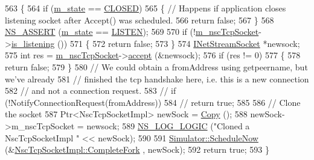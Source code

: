 \begin{DoxyCode}
563 \{
564   \textcolor{keywordflow}{if} (\hyperlink{classns3_1_1NscTcpSocketImpl_aa60a97fe06f4b74ed57101a297d6216c}{m\_state} == \hyperlink{group__tcp_gga3929cdb47bdf159657fa24054aa5ca03a9ce7d71243551037394c5e691627e66f}{CLOSED})
565     \{  \textcolor{comment}{// Happens if application closes listening socket after Accept() was scheduled.}
566       \textcolor{keywordflow}{return} \textcolor{keyword}{false};
567     \}
568   \hyperlink{assert_8h_a6dccdb0de9b252f60088ce281c49d052}{NS\_ASSERT} (\hyperlink{classns3_1_1NscTcpSocketImpl_aa60a97fe06f4b74ed57101a297d6216c}{m\_state} == \hyperlink{group__tcp_gga3929cdb47bdf159657fa24054aa5ca03a581d49096b20553996c0ef8aaf2712f8}{LISTEN});
569 
570   \textcolor{keywordflow}{if} (!\hyperlink{classns3_1_1NscTcpSocketImpl_a540a25a7e3ea5777872b16662da3e616}{m\_nscTcpSocket}->\hyperlink{structINetStreamSocket_a26fa9760ab071598a8b1b4da9e852b09}{is\_listening} ())
571     \{
572       \textcolor{keywordflow}{return} \textcolor{keyword}{false};
573     \}
574   \hyperlink{structINetStreamSocket}{INetStreamSocket} *newsock;
575   \textcolor{keywordtype}{int} res = \hyperlink{classns3_1_1NscTcpSocketImpl_a540a25a7e3ea5777872b16662da3e616}{m\_nscTcpSocket}->\hyperlink{structINetStreamSocket_af2bd0b33de3a8a30f539eda297786188}{accept} (&newsock);
576   \textcolor{keywordflow}{if} (res != 0)
577     \{
578       \textcolor{keywordflow}{return} \textcolor{keyword}{false};
579     \}
580 \textcolor{comment}{// We could obtain a fromAddress using getpeername, but we've already}
581 \textcolor{comment}{// finished the tcp handshake here, i.e. this is a new connection}
582 \textcolor{comment}{// and not a connection request.}
583 \textcolor{comment}{// if (!NotifyConnectionRequest(fromAddress))}
584 \textcolor{comment}{//   return true;}
585 
586   \textcolor{comment}{// Clone the socket}
587   Ptr<NscTcpSocketImpl> newSock = \hyperlink{classns3_1_1NscTcpSocketImpl_a4a6a5f3eef17264ef8529a46a8be72aa}{Copy} ();
588   newSock->m\_nscTcpSocket = newsock;
589   \hyperlink{group__logging_ga88acd260151caf2db9c0fc84997f45ce}{NS\_LOG\_LOGIC} (\textcolor{stringliteral}{"Cloned a NscTcpSocketImpl "} << newSock);
590 
591   \hyperlink{classns3_1_1Simulator_a2219ee02c0647adc83d1c918c3256266}{Simulator::ScheduleNow} (&\hyperlink{classns3_1_1NscTcpSocketImpl_a97c12e4b7625d21acce2bee3abfd87c4}{NscTcpSocketImpl::CompleteFork}
      , newSock);
592   \textcolor{keywordflow}{return} \textcolor{keyword}{true};
593 \}
\end{DoxyCode}



